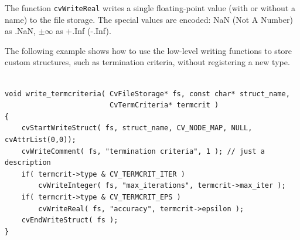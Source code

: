 The function \texttt{cvWriteReal} writes a single floating-point
value (with or without a name) to the file storage. The special
values are encoded: NaN (Not A Number) as .NaN, $ \pm \infty $ as +.Inf
(-.Inf).

The following example shows how to use the low-level writing functions
to store custom structures, such as termination criteria, without
registering a new type.

\begin{lstlisting}

void write_termcriteria( CvFileStorage* fs, const char* struct_name,
                         CvTermCriteria* termcrit )
{
    cvStartWriteStruct( fs, struct_name, CV_NODE_MAP, NULL, cvAttrList(0,0));
    cvWriteComment( fs, "termination criteria", 1 ); // just a description
    if( termcrit->type & CV_TERMCRIT_ITER )
        cvWriteInteger( fs, "max_iterations", termcrit->max_iter );
    if( termcrit->type & CV_TERMCRIT_EPS )
        cvWriteReal( fs, "accuracy", termcrit->epsilon );
    cvEndWriteStruct( fs );
}

\end{lstlisting}

